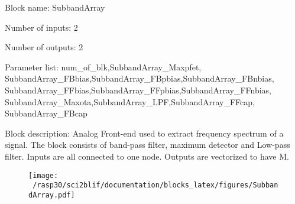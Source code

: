 \pagebreak

Block name: SubbandArray

Number of inputs: 2

Number of outputs: 2

Parameter list: num\_of\_blk,SubbandArray\_Maxpfet,\\SubbandArray\_FBbias,SubbandArray\_FBpbias,SubbandArray\_FBnbias,\\SubbandArray\_FFbias,SubbandArray\_FFpbias,SubbandArray\_FFnbias,\\SubbandArray\_Maxota,SubbandArray\_LPF,SubbandArray\_FFcap,\\SubbandArray\_FBcap

Block description: 
Analog Front-end used to extract frequency spectrum of a signal. The block consists of band-pass filter, maximum detector and Low-pass filter. 
Inputs are all connected to one node. Outputs are vectorized to have M. 

\begin{figure}[H]  %
\texttt{[image: ~/rasp30/sci2blif/documentation/blocks\_latex/figures/SubbandArray.pdf]}
\end{figure}

